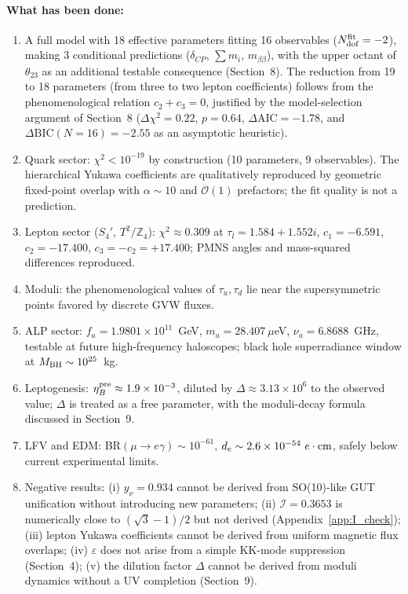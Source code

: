 \documentclass[12pt,a4paper]{article}
\numberwithin{equation}{section}
\begin{document}
\paragraph{What has been done:}
\begin{enumerate}[leftmargin=1.5em]
\item A full model with 18 effective parameters fitting
16 observables (\(N_{\rm dof}^{\rm fit} = -2\)), making 3 conditional
predictions (\(\delta_{CP}\), \(\sum m_i\), \(m_{\beta\beta}\)), with the
upper octant of \(\theta_{23}\) as an additional testable consequence
(Section~8). The reduction from 19 to 18 parameters (from three
to two lepton coefficients) follows from the phenomenological
relation \(c_2 + c_3 = 0\), justified by the model-selection argument
of Section~8 (\(\Delta\chi^2 = 0.22\), \(p = 0.64\), \(\Delta\mathrm{AIC} = -1.78\), and \(\Delta\mathrm{BIC}(N{=}16) = -2.55\) as an asymptotic heuristic).
\item Quark sector: \(\chi^2 < 10^{-19}\) by construction (10 parameters, 9 observables). The hierarchical Yukawa coefficients are qualitatively reproduced by geometric fixed-point overlap with \(\alpha \sim 10\) and \(\mathcal{O}(1)\) prefactors; the fit quality is not a prediction.
\item Lepton sector (\(S_4'\), \(T^2/\mathbb{Z}_4\)): \(\chi^2 \approx 0.309\) at \(\tau_l = 1.584 + 1.552i\), \(c_1 = -6.591\), \(c_2 = -17.400\), \(c_3 = -c_2 = +17.400\); PMNS angles and mass-squared differences reproduced.
\item Moduli: the phenomenological values of \(\tau_u, \tau_d\) lie near the supersymmetric points favored by discrete GVW fluxes.
\item ALP sector: \(f_a = 1.9801 \times 10^{11}\)~GeV, \(m_a = 28.407~\mu\)eV, \(\nu_a = 6.8688\)~GHz, testable at future high-frequency haloscopes; black hole superradiance window at \(M_{\rm BH} \sim 10^{25}\)~kg.
\item Leptogenesis: \(\eta_B^{\rm pre} \approx 1.9\times10^{-3}\), diluted by \(\Delta \approx 3.13\times 10^6\) to the observed value; \(\Delta\) is treated as a free parameter, with the moduli-decay formula discussed in Section~9.
\item LFV and EDM: BR\((\mu\to e\gamma) \sim 10^{-61}\), \(d_e \sim 2.6\times 10^{-54}~e\cdot{\rm cm}\), safely below current experimental limits.
\item Negative results: (i) \(y_\nu = 0.934\) cannot be derived from SO(10)-like GUT unification without introducing new parameters; (ii) \(\mathcal I = 0.3653\) is numerically close to \((\sqrt3-1)/2\) but not derived (Appendix~\ref{app:I_check}); (iii) lepton Yukawa coefficients cannot be derived from uniform magnetic flux overlaps; (iv) \(\varepsilon\) does not arise from a simple KK-mode suppression (Section~4); (v) the dilution factor \(\Delta\) cannot be derived from moduli dynamics without a UV completion (Section~9).
\end{enumerate}
\end{document}
